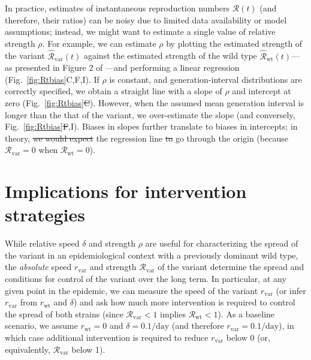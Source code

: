 \documentclass[12pt]{article}
\newcommand{\fref}[1]{Fig.~\ref{fig:#1}}
\newcommand{\vvvar}{\mathrm{var}}
\newcommand{\wwwt}{\mathrm{wt}}
\newcommand{\rx}[1]{\ensuremath{{r}_{#1}}\xspace}
\newcommand{\rw}{\rx{\wwwt}}
\newcommand{\rv}{\rx{\vvvar}}
\newcommand{\Rx}[1]{\ensuremath{{\mathcal R}_{#1}}\xspace}
\newcommand{\RR}{\ensuremath{{\mathcal R}}\xspace}
\newcommand{\Rw}{\Rx{\wwwt}}
\newcommand{\Rv}{\Rx{\vvvar}}
\newcommand{\pday}{\ensuremath{/\textrm{day}}}
\providecommand{\DIFaddtex}[1]{{\protect\color{blue}\uwave{#1}}} %
\providecommand{\DIFdeltex}[1]{{\protect\color{red}\sout{#1}}}                      %
\providecommand{\DIFaddbegin}{} %
\providecommand{\DIFaddend}{} %
\providecommand{\DIFdelbegin}{} %
\providecommand{\DIFdelend}{} %
\providecommand{\DIFadd}[1]{\texorpdfstring{\DIFaddtex{#1}}{#1}} %
\providecommand{\DIFdel}[1]{\texorpdfstring{\DIFdeltex{#1}}{}} %
\newcommand{\DIFscaledelfig}{0.5}
\newlength{\DIFdelgraphicswidth} %
\newlength{\DIFdelgraphicsheight} %
\newcommand{\DIFaddincludegraphics}[2][]{{\color{blue}\fbox{\DIFOincludegraphics[#1]{#2}}}} %
\newcommand{\DIFdelincludegraphics}[2][]{%
\sbox{\DIFdelgraphicsbox}{\DIFOincludegraphics[#1]{#2}}%
\settoboxwidth{\DIFdelgraphicswidth}{\DIFdelgraphicsbox} %
\settoboxtotalheight{\DIFdelgraphicsheight}{\DIFdelgraphicsbox} %
\scalebox{\DIFscaledelfig}{%
\parbox[b]{\DIFdelgraphicswidth}{\usebox{\DIFdelgraphicsbox}\\[-\baselineskip] \rule{\DIFdelgraphicswidth}{0em}}\llap{\resizebox{\DIFdelgraphicswidth}{\DIFdelgraphicsheight}{%
\setlength{\unitlength}{\DIFdelgraphicswidth}%
\begin{picture}(1,1)%
\thicklines\linethickness{2pt} %
{\color[rgb]{1,0,0}\put(0,0){\framebox(1,1){}}}%
{\color[rgb]{1,0,0}\put(0,0){\line( 1,1){1}}}%
{\color[rgb]{1,0,0}\put(0,1){\line(1,-1){1}}}%
\end{picture}%
}\hspace*{3pt}}} %
} %
\DeclareRobustCommand{\DIFaddbegin}{\DIFOaddbegin \let\includegraphics\DIFaddincludegraphics} %
\DeclareRobustCommand{\DIFaddend}{\DIFOaddend \let\includegraphics\DIFOincludegraphics} %
\DeclareRobustCommand{\DIFdelbegin}{\DIFOdelbegin \let\includegraphics\DIFdelincludegraphics} %
\DeclareRobustCommand{\DIFdelend}{\DIFOaddend \let\includegraphics\DIFOincludegraphics} %
\begin{document}
In practice, estimates of instantaneous reproduction numbers $\RR(t)$ (and therefore, their ratios) can be noisy due to limited data availability or model assumptions;
instead, we might want to estimate a single value of relative strength $\rho$.
For example, we can estimate $\rho$ by plotting the estimated strength of the variant $\hat{\RR}_{\textrm{var}}(t)$ against the estimated strength of the wild type $\hat{\RR}_{\textrm{wt}}(t)$---as presented in Figure 2 of \cite{volz2021transmission}---and performing a linear regression (\fref{Rtbias}C,F,I).
If $\rho$ is constant, and generation-interval distributions are correctly specified, we obtain a straight line with a slope of $\rho$ and intercept at zero (\fref{Rtbias}\DIFdelbegin \DIFdel{C}\DIFdelend \DIFaddbegin \DIFadd{F}\DIFaddend ).
However, when the assumed mean generation interval is longer than the that of the variant, we over-estimate the slope (and conversely, \fref{Rtbias}\DIFdelbegin \DIFdel{F}\DIFdelend \DIFaddbegin \DIFadd{C}\DIFaddend ,I).
Biases in slopes further translate to biases in intercepts; in theory, \DIFdelbegin \DIFdel{we would expect }\DIFdelend the regression line \DIFdelbegin \DIFdel{to }\DIFdelend \DIFaddbegin \DIFadd{should }\DIFaddend go through the origin (because $\Rv = 0$ when $\Rw = 0$).

\section{Implications for intervention strategies}

While relative speed $\delta$ and strength $\rho$ are useful for characterizing the spread of the variant in an epidemiological context with a previously dominant wild type, the \emph{absolute} speed $\rv$ and strength $\Rv$ of the variant determine the spread and conditions for control of the variant over the long term.
In particular, at any given point in the epidemic, we can measure the speed of the variant $\rv$ (or infer $\rv$ from $\rw$ and $\delta$) and ask how much more intervention is required to control the spread of both strains (since $\Rv < 1$ implies $\Rw < 1$).
As a baseline scenario, we assume $\rw=0$ and $\delta=0.1\pday$ (and therefore $\rv=0.1\pday$), in which case additional intervention is required to reduce $\rv$ below 0 (or, equivalently, $\Rv$ below 1).
\end{document}
